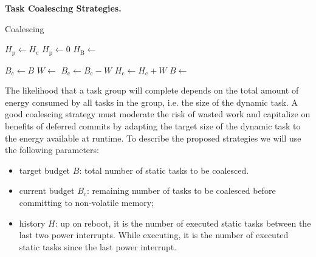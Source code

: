 \textbf{Task Coalescing Strategies.} 
%
\begin{algorithm}[t]
	\caption{Coalescing}
	\label{algo:genCoalescing}
	\scriptsize
	\begin{algorithmic}[1]
        \State $H_\text{p} \gets H_\text{c}$
        \State $H_\text{p} \gets 0$ 
        \State $H_\text{B} \leftarrow $ 

	        \State $ B_\text{c} \gets B$
		        \State {}
		        \State $W \leftarrow $ 
		        \State $B_\text{c} \gets B_\text{c} - W$
				\State $H_\text{c} \gets H_\text{c} + W$
	        \EndWhile
	         \State $B \leftarrow $ 
	        \State {}
        \EndWhile
	\end{algorithmic}
\end{algorithm}
%
%
The likelihood that a task group will complete depends on the total amount of
energy consumed by all tasks in the group, i.e. the size of the dynamic task.
%
A good coalescing strategy must moderate the risk of wasted work and capitalize
on benefits of deferred commits by adapting the target size of the dynamic task
to the energy available at runtime. 
%
To describe the proposed strategies we will use the following parameters:
\begin{itemize}
\item target budget $B$: total number of static tasks to be coalesced.
\item current budget $B_\text{c}$: remaining number of tasks to be coalesced before committing to non-volatile memory; 
\item history $H$: up on reboot, it is the number of executed static tasks between the last two power interrupts. While executing, it is the number of executed static tasks since the last power interrupt.
\end{itemize}


 

